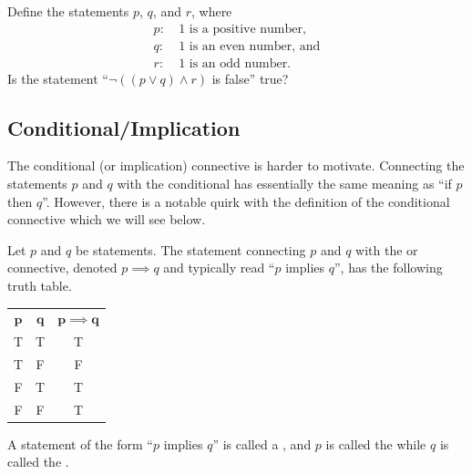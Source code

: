 \begin{exercise}
    Define the statements $p$, $q$, and $r$, where
    \begin{align*}
        p: &\ \text{1 is a positive number},\\
        q: &\ \text{1 is an even number}, \text{ and}\\
        r: &\ \text{1 is an odd number}.
    \end{align*}
    Is the statement ``$\lnot((p \lor q) \land r)$ is false'' true?
\end{exercise}

\subsection{Conditional/Implication}
The conditional (or implication) connective is harder to motivate. Connecting the statements $p$ and $q$ with the conditional has essentially the same meaning as ``if $p$ then $q$''. However, there is a notable quirk with the definition of the conditional connective which we will see below.

\begin{definition}
    Let $p$ and $q$ be statements. The statement connecting $p$ and $q$ with the  or  connective, denoted $p \implies q$ and typically read ``$p$ implies $q$'', has the following truth table.
    \begin{table}[H]
        \centering
        \begin{tabular}{|c|c||c|}
            \hline
            $\boldsymbol{p}$ & $\boldsymbol{q}$ & $\boldsymbol{p \implies q}$ \\ \hhline{|=|=#=|}
            T & T & T \\ \hline
            T & F & F \\ \hline
            F & T & T \\ \hline
            F & F & T \\ \hline
        \end{tabular}
    \end{table}
    A statement of the form ``$p$ implies $q$'' is called a , and $p$ is called the  while $q$ is called the .
\end{definition}

